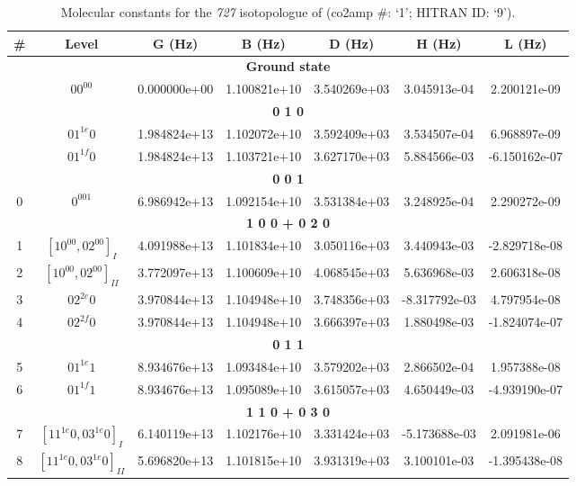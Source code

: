 \begin{table}[h!]
\caption{Molecular constants for the \textit{727} isotopologue of  (co2amp \#: ‘1’; HITRAN ID: ‘9’).}
\label{table:constants_727}
\centering
\begin{tabular}{|c|c|c|c|c|c|c|}
\hline
\textbf{\#} & \textbf{Level} & \textbf{G (Hz)} & \textbf{B (Hz)} & \textbf{D (Hz)} & \textbf{H (Hz)} & \textbf{L (Hz)} \\ \hline
\multicolumn{7}{|c|}{\textbf{Ground state}} \\ \hline
 & $00^00$ & 0.000000e+00 & 1.100821e+10 & 3.540269e+03 & 3.045913e-04 & 2.200121e-09 \\ \hline
\multicolumn{7}{|c|}{\textbf{0 1 0}} \\ \hline
 & $01^{1e}0$ & 1.984824e+13 & 1.102072e+10 & 3.592409e+03 & 3.534507e-04 & 6.968897e-09 \\ \hline
 & $01^{1f}0$ & 1.984824e+13 & 1.103721e+10 & 3.627170e+03 & 5.884566e-03 & -6.150162e-07 \\ \hline
\multicolumn{7}{|c|}{\textbf{0 0 1}} \\ \hline
0 & $0^001$ & 6.986942e+13 & 1.092154e+10 & 3.531384e+03 & 3.248925e-04 & 2.290272e-09 \\ \hline
\multicolumn{7}{|c|}{\textbf{1 0 0 + 0 2 0}} \\ \hline
1 & $[10^00, 02^00]_{I}$ & 4.091988e+13 & 1.101834e+10 & 3.050116e+03 & 3.440943e-03 & -2.829718e-08 \\ \hline
2 & $[10^00, 02^00]_{II}$ & 3.772097e+13 & 1.100609e+10 & 4.068545e+03 & 5.636968e-03 & 2.606318e-08 \\ \hline
3 & $02^{2e}0$ & 3.970844e+13 & 1.104948e+10 & 3.748356e+03 & -8.317792e-03 & 4.797954e-08 \\ \hline
4 & $02^{2f}0$ & 3.970844e+13 & 1.104948e+10 & 3.666397e+03 & 1.880498e-03 & -1.824074e-07 \\ \hline
\multicolumn{7}{|c|}{\textbf{0 1 1}} \\ \hline
5 & $01^{1e}1$ & 8.934676e+13 & 1.093484e+10 & 3.579202e+03 & 2.866502e-04 & 1.957388e-08 \\ \hline
6 & $01^{1f}1$ & 8.934676e+13 & 1.095089e+10 & 3.615057e+03 & 4.650449e-03 & -4.939190e-07 \\ \hline
\multicolumn{7}{|c|}{\textbf{1 1 0 + 0 3 0}} \\ \hline
7 & $[11^{1e}0, 03^{1e}0]_{I}$ & 6.140119e+13 & 1.102176e+10 & 3.331424e+03 & -5.173688e-03 & 2.091981e-06 \\ \hline
8 & $[11^{1e}0, 03^{1e}0]_{II}$ & 5.696820e+13 & 1.101815e+10 & 3.931319e+03 & 3.100101e-03 & -1.395438e-08 \\ \hline

\end{tabular}
\end{table}
